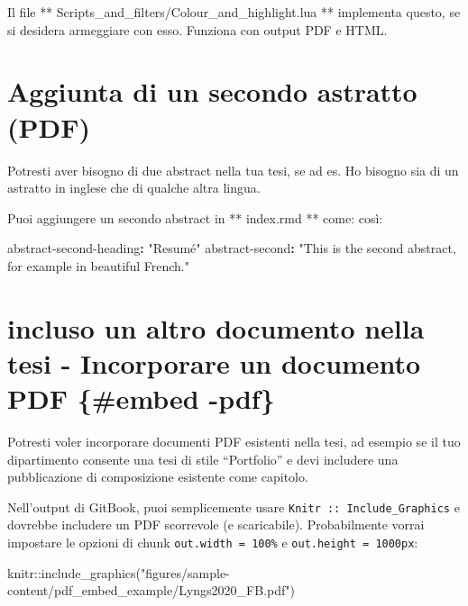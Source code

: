 \documentclass[a4paper, 11pt, nobind]{templates/ociamthesis}
\newenvironment{Shaded}{\begin{snugshade}}{\end{snugshade}}
\newcommand{\AttributeTok}[1]{\textcolor[rgb]{0.77,0.63,0.00}{#1}}
\newcommand{\FunctionTok}[1]{\textcolor[rgb]{0.00,0.00,0.00}{#1}}
\newcommand{\KeywordTok}[1]{\textcolor[rgb]{0.13,0.29,0.53}{\textbf{#1}}}
\newcommand{\NormalTok}[1]{#1}
\newcommand{\SpecialCharTok}[1]{\textcolor[rgb]{0.00,0.00,0.00}{#1}}
\newcommand{\StringTok}[1]{\textcolor[rgb]{0.31,0.60,0.02}{#1}}
\renewenvironment{Shaded}
{
  \vspace{10pt}%
  \begin{snugshade}%
}{%
  \end{snugshade}%
  \vspace{8pt}%
}
\begin{document}
Il file ** Scripts\_and\_filters/Colour\_and\_highlight.lua ** implementa questo, se si desidera armeggiare con esso.
Funziona con output PDF e HTML.

\hypertarget{aggiunta-di-un-secondo-astratto-pdf}{%
\section{Aggiunta di un secondo astratto (PDF)}\label{aggiunta-di-un-secondo-astratto-pdf}}

Potresti aver bisogno di due abstract nella tua tesi, se ad es. Ho bisogno sia di un astratto in inglese che di qualche altra lingua.

Puoi aggiungere un secondo abstract in ** index.rmd ** come: così:

\begin{Shaded}
\begin{Highlighting}[]
\FunctionTok{abstract{-}second{-}heading}\KeywordTok{:}\AttributeTok{ }\StringTok{"Resumé"}
\FunctionTok{abstract{-}second}\KeywordTok{:}\AttributeTok{ }\StringTok{"This is the second abstract, for example in beautiful French."}\AttributeTok{ }
\end{Highlighting}
\end{Shaded}

\hypertarget{incluso-un-altro-documento-nella-tesi---incorporare-un-documento-pdf-embed--pdf}{%
\section{incluso un altro documento nella tesi - Incorporare un documento PDF \{\#embed -pdf\}}\label{incluso-un-altro-documento-nella-tesi---incorporare-un-documento-pdf-embed--pdf}}

Potresti voler incorporare documenti PDF esistenti nella tesi, ad esempio se il tuo dipartimento consente una tesi di stile ``Portfolio'' e devi includere una pubblicazione di composizione esistente come capitolo.

Nell'output di GitBook, puoi semplicemente usare \texttt{Knitr\ ::\ Include\_Graphics} e dovrebbe includere un PDF scorrevole (e scaricabile).
Probabilmente vorrai impostare le opzioni di chunk \texttt{out.width\ =\ \textquotesingle{}100\%\textquotesingle{}} e \texttt{out.height\ =\ \textquotesingle{}1000px\textquotesingle{}}:

\begin{Shaded}
\begin{Highlighting}[]
\NormalTok{knitr}\SpecialCharTok{::}\FunctionTok{include\_graphics}\NormalTok{(}\StringTok{"figures/sample{-}content/pdf\_embed\_example/Lyngs2020\_FB.pdf"}\NormalTok{)}
\end{Highlighting}
\end{Shaded}
\end{document}
